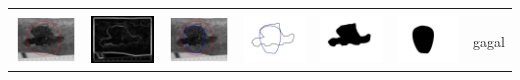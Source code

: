 \begin{table}[H]
\begin{tabular}{|m{0.7in}|m{0.7in}|m{0.7in}|m{0.7in}|m{0.7in}|m{0.7in}|m{0.7in}|}
		&  &  & & & &  \\
		\includegraphics[width=0.7in]{dataset/dataset_3/luka_merah/ready/23_interp_init.jpg}&
		\includegraphics[width=0.7in]{dataset/dataset_3/luka_merah/ready/23_interp_ext.jpg}&
		\includegraphics[width=0.7in]{dataset/dataset_3/luka_merah/ready/23_interp_result.jpg}&
		\includegraphics[width=0.7in]{dataset/dataset_3/luka_merah/ready/23_gt_r.jpg}&
		\includegraphics[width=0.7in]{dataset/dataset_3/luka_merah/ready/23_r.jpg}&
		\includegraphics[width=0.7in]{dataset/dataset_3/luka_merah/ready/23_interp_r.jpg}&
		gagal\\
		\hline
		
	\end{tabular}
\end{table}

